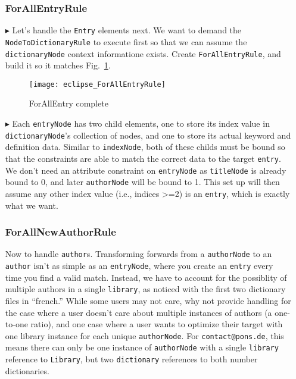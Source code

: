 \begin{itemize}
\newpage

\subsubsection{ForAllEntryRule} %

\item[$\blacktriangleright$] Let's handle the \texttt{Entry} elements next. We want to demand the \texttt{Node\-To\-Dict\-ion\-ary\-Rule} to execute first so
that we can assume the \texttt{dictionaryNode} context informatione exists. Create \texttt{ForAllEntryRule}, and build it so it matches
Fig.~\ref{eclipse:ForAllEntryRule}.

\begin{figure}[htbp]
\begin{center}
  \texttt{[image: eclipse\_ForAllEntryRule]}
  \caption{ForAllEntry complete}
  \label{eclipse:ForAllEntryRule}
\end{center}
\end{figure}

\item[$\blacktriangleright$] Each \texttt{entryNode} has two child elements, one to store its index value in \texttt{dictionaryNode}'s collection of nodes, and
one to store its actual keyword and definition data. Similar to \texttt{indexNode}, both of these childs must be bound so that the constraints are able to match
the correct data to the target \texttt{entry}. We don't need an attribute constraint on \texttt{entryNode} as \texttt{titleNode} is already bound to 0, and
later \texttt{authorNode} will be bound to 1. This set up will then assume any other index value (i.e., indices >=2) is an \texttt{entry}, which is exactly what
we want.

\newpage

\subsubsection{ForAllNewAuthorRule} %

Now to handle \texttt{author}s. Transforming forwards from a \texttt{authorNode} to an \texttt{author} isn't as simple as an
\texttt{entryNode}, where you create an \texttt{entry} every time you find a valid match. Instead, we have to account for the possiblity of multiple authors in
a single \texttt{library}, as noticed with the first two dictionary files in ``french.'' While some users may not care, why not provide handling for the case
where a user doesn't care about multiple instances of authors (a one-to-one ratio), and one case where a user wants to optimize their target with one library
instance for each unique \texttt{authorNode}. For \texttt{contact@pons.de}, this means there can only be one instance of \texttt{authorNode} with a single
\texttt{library} reference to \texttt{Library}, but two \texttt{dictionary} references to both number dictionaries.


\end{itemize}
